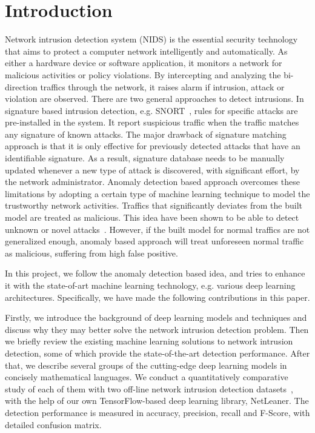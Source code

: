 \section{Introduction}

Network intrusion detection system (NIDS) is the essential security technology that
aims to protect a computer network intelligently and automatically.
As either a hardware device or software application,
it monitors a network for malicious activities or policy violations.
By intercepting and analyzing the bi-direction traffics through the network,
it raises alarm if intrusion, attack or violation are observed.
There are two general approaches to detect intrusions.
In signature based intrusion detection, e.g. SNORT~\cite{Snort},
rules for specific attacks are pre-installed in the system.
It report suspicious traffic when the traffic matches any signature of known attacks.
The major drawback of signature matching approach is that
it is only effective for previously detected attacks that have an identifiable signature.
As a result, signature database needs to be manually updated whenever a new type of attack
is discovered, with significant effort, by the network administrator.
Anomaly detection based approach overcomes these limitations by adopting a certain
type of machine learning technique to model the trustworthy network activities.
Traffics that significantly deviates from the built model are treated as malicious.
This idea have been shown to be able to detect unknown or novel attacks~\cite{NSL-KDD, STL-NIDS}.
However, if the built model for normal traffics are not generalized enough,
anomaly based approach will treat unforeseen normal traffic as malicious,
suffering from high false positive.

In this project, we follow the anomaly detection based idea, and tries to enhance it with the
state-of-art machine learning technology, e.g. various deep learning architectures.
Specifically, we have made the following contributions in this paper.

Firstly, we introduce the background of deep learning models and techniques and discuss why they may better solve the
network intrusion detection problem.
Then we briefly review the existing machine learning solutions to network intrusion detection,
some of which provide the state-of-the-art detection performance.
After that, we describe several groups of the cutting-edge deep learning models
in concisely mathematical languages.
We conduct a quantitatively comparative study of each of them with two off-line network intrusion detection datasets~\cite{NSL-KDD, UNSW},
with the help of our own TensorFlow-based deep learning library, NetLeaner.
The detection performance is measured in accuracy, precision, recall and F-Score,
with detailed confusion matrix.

